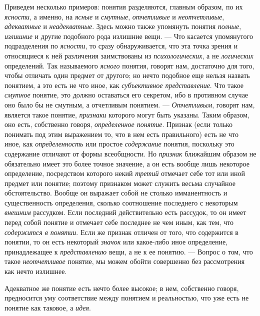 \documentclass[twoside]{article}
\begin{document}
{{Приведем несколько примеров: понятия разделяются, главным
образом, по их {\em ясности},
а именно, на {\em ясные}
и {\em смутные},
{\em отчетливые} и
{\em неотчетливые},
{\em адекватные} и
{\em неадекватные}. Здесь
можно также упомянуть понятия
{\em полные},
{\em излишние} и другие
подобного рода излишние вещи. — Что касается упомянутого
подразделения по {\em ясности},
то сразу обнаруживается, что эта точка зрения и относящиеся к
ней различения заимствованы из
{\em психологических}, а
не {\em логических}
определений. Так называемого
{\em ясного} понятия,
говорят нам, достаточно для того, чтобы отличать один предмет от другого;
но нечто подобное еще нельзя назвать понятием, а это есть не что иное, как
{\em субъективное представление}.
Что такое {\em смутное}
понятие, это должно оставаться его секретом, ибо в противном
случае оно было бы не смутным, а отчетливым понятием. —
{\em Отчетливым}, говорят
нам, является такое понятие,
{\em признаки} которого
могут быть указаны. Таким образом, оно есть, собственно говоря,
{\em определенное понятие}.
Признак (если только понимать под этим выражением то, что в
нем есть правильного) есть не что иное, как
{\em определенность} или
простое {\em содержание}
понятия, поскольку это содержание отличают от формы
всеобщности. Но {\em признак}
ближайшим образом не обязательно имеет это более точное
значение, а он есть вообще лишь некоторое определение, посредством которого
некий {\em третий}
отмечает себе тот или иной предмет или понятие; поэтому
признаком может служить весьма случайное обстоятельство. Вообще он выражает
собой не столько имманентность и существенность определения, сколько
соотношение последнего с некоторым
{\em внешним} рассудком.
Если последний действительно есть рассудок, то он имеет перед собой понятие
и отмечает себе последнее не чем иным, как тем, что
{\em содержится в понятии}.
Если же признак отличен от того, что содержится в понятии, то
он есть некоторый {\em значок}
или какое-либо иное определение, принадлежащее к
{\em представлению} вещи,
а не к ее понятию. — Вопрос о том, что такое
{\em неотчетливое}
понятие, мы можем обойти совершенно без рассмотрения как
нечто излишнее.

Адекватное же понятие есть нечто более высокое; в нем,
собственно говоря, предносится уму соответствие между понятием и
реальностью, что уже есть не понятие как таковое, а
{\em идея}.

}}
\end{document}
